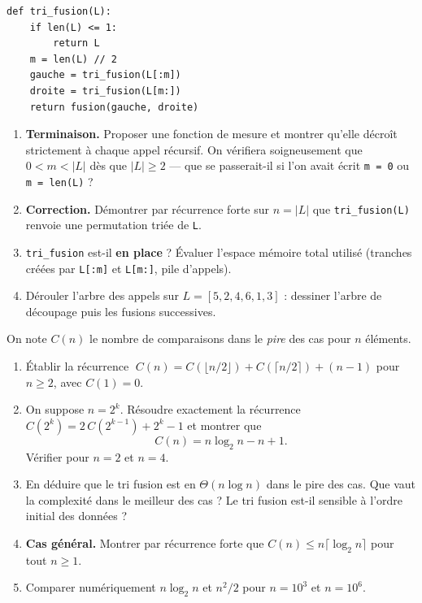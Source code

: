 \documentclass[11pt,a4paper]{article}
\begin{document}
\begin{lstlisting}
def tri_fusion(L):
    if len(L) <= 1:
        return L
    m = len(L) // 2
    gauche = tri_fusion(L[:m])
    droite = tri_fusion(L[m:])
    return fusion(gauche, droite)
\end{lstlisting}

\begin{enumerate}[label=\arabic*.,leftmargin=*]
  \item \textbf{Terminaison.} Proposer une fonction de mesure et montrer qu'elle
        décroît strictement à chaque appel récursif. On vérifiera soigneusement que
        $0<m<|L|$ dès que $|L|\ge2$ --- que se passerait-il si l'on avait écrit
        \texttt{m = 0} ou \texttt{m = len(L)} ?
  \item \textbf{Correction.} Démontrer par récurrence forte sur $n=|L|$ que
        \texttt{tri\_fusion(L)} renvoie une permutation triée de \texttt{L}.
  \item \texttt{tri\_fusion} est-il \textbf{en place} ? Évaluer l'espace mémoire total
        utilisé (tranches créées par \texttt{L[:m]} et \texttt{L[m:]}, pile d'appels).
  \item Dérouler l'arbre des appels sur $L=[5,2,4,6,1,3]$ : dessiner l'arbre de
        découpage puis les fusions successives.
\end{enumerate}

On note $C(n)$ le nombre de comparaisons dans le \emph{pire} des cas pour $n$ éléments.

\begin{enumerate}[label=\arabic*.,leftmargin=*]
  \item Établir la récurrence
        $\;C(n)=C(\lfloor n/2\rfloor)+C(\lceil n/2\rceil)+ (n-1)$ pour $n\ge2$,
        avec $C(1)=0$.
  \item On suppose $n=2^{k}$. Résoudre exactement la récurrence
        $C(2^{k}) = 2\,C(2^{k-1}) + 2^{k}-1$ et montrer que
        \[
          C(n) = n\log_2 n - n + 1 .
        \]
        Vérifier pour $n=2$ et $n=4$.
  \item En déduire que le tri fusion est en $\Theta(n\log n)$ dans le pire des cas.
        Que vaut la complexité dans le meilleur des cas ? Le tri fusion est-il sensible
        à l'ordre initial des données ?
  \item \textbf{Cas général.} Montrer par récurrence forte que
        $C(n)\le n\lceil\log_2 n\rceil$ pour tout $n\ge1$.
  \item Comparer numériquement $n\log_2 n$ et $n^2/2$ pour $n=10^{3}$ et $n=10^{6}$.
\end{enumerate}
\end{document}
